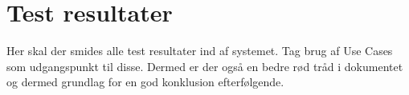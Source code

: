 \graphicspath{{Chapters/Alternative/}}


\section{Test resultater}



Her skal der smides alle test resultater ind af systemet. Tag brug af Use Cases som udgangspunkt til disse. Dermed er der også en bedre rød tråd i dokumentet og dermed grundlag for en god konklusion efterfølgende.
